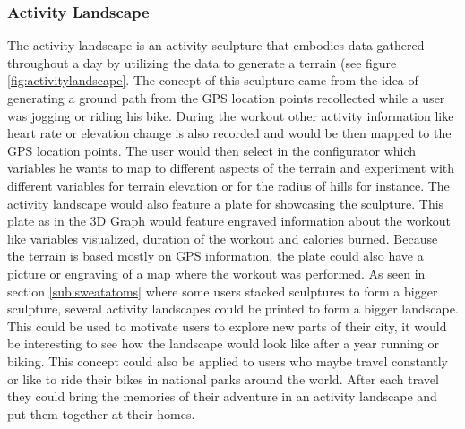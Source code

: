 \documentclass[../medieninformatik-arbeit.tex]{subfiles}
\begin{document}
\subsubsection{Activity Landscape}
The activity landscape is an activity sculpture that embodies data gathered throughout a day by utilizing the data to generate a terrain (see figure \ref{fig:activitylandscape}. The concept of this sculpture came from the idea of generating a ground path from the GPS location points recollected while a user was jogging or riding his bike. During the workout other activity information like heart rate or elevation change is also recorded and would be then mapped to the GPS location points. The user would then select in the configurator which variables he wants to map to different aspects of the terrain and experiment with different variables for terrain elevation or for the radius of hills for instance. The activity landscape would also feature a plate for showcasing the sculpture. This plate as in the 3D Graph would feature engraved information about the workout like variables visualized, duration of the workout and calories burned. Because the terrain is based mostly on GPS information, the plate could also have a picture or engraving of a map where the workout was performed. As seen in section \ref{sub:sweatatoms} where some users stacked sculptures to form a bigger sculpture, several activity landscapes could be printed to form a bigger landscape. This could be used to motivate users to explore new parts of their city, it would be interesting to see how the landscape would look like after a year running or biking. This concept could also be applied to users who maybe travel constantly or like to ride their bikes in national parks around the world. After each travel they could bring the memories of their adventure in an activity landscape and put them together at their homes. 
\end{document}
